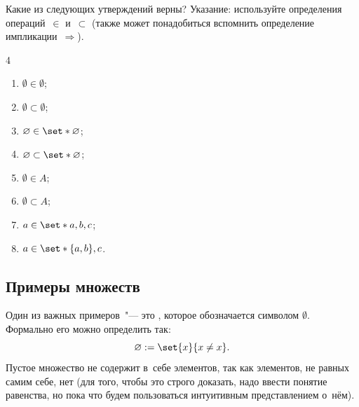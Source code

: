 \begin{exercise}
	Какие из следующих утверждений верны? Указание: используйте
	определения операций~$\in$ и~$\subset$ (также может понадобиться
	вспомнить определение импликации~$\Longrightarrow$).
	\begin{multicols}{4}
		\begin{enumerate}[1)]
			\item $\emptyset \in     \emptyset$;
			\item $\emptyset \subset \emptyset$;
			\item $\emptyset \in     \set*{\emptyset}$;
			\item $\emptyset \subset \set*{\emptyset}$;
			\item $\emptyset \in     A$;
			\item $\emptyset \subset A$;
			\item $a \in \set*{a, b, c}$;
			\item $a \in \set*{ \{ a, b \}, c}$.
		\end{enumerate}
	\end{multicols}
\end{exercise}

\subsection{Примеры множеств}

\begin{example}
	Один из важных примеров~"--- это , которое
	обозначается символом $\emptyset$. Формально его можно определить так:
	\[
		\emptyset := \set{x}{x \neq x}
		.
	\]
	Пустое множество не содержит в~себе элементов, так как элементов, не равных
	самим себе, нет (для того, чтобы это строго доказать, надо ввести понятие
	равенства, но пока что будем пользоваться интуитивным представлением о~нём).
\end{example}

